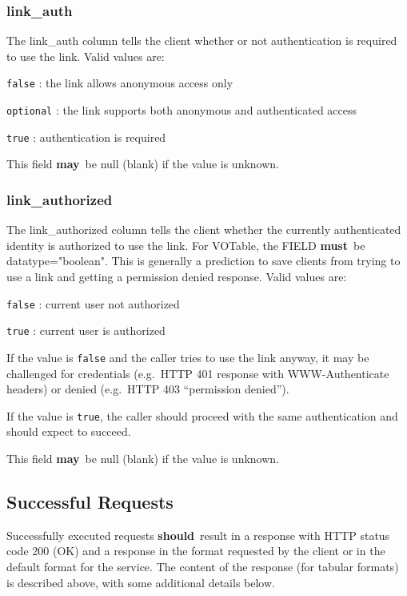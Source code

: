 \documentclass[11pt,a4paper]{ivoa}
\newcommand{\attval}[2]{#1={\allowbreak}{"}#2{"}}
\newcommand{\rfcmust}{\textbf{must}}
\newcommand{\rfcshould}{\textbf{should}}
\newcommand{\rfcmay}{\textbf{may}}
\begin{document}
\subsubsection{link\_auth}
\label{sec:linkAuth}

The link\_auth column tells the client whether or not authentication is required
to use the link. Valid values are:

\verb|false| : the link allows anonymous access only

\verb|optional| : the link supports both anonymous and authenticated access

\verb|true| : authentication is required

This field \rfcmay\ be null (blank) if the value is unknown.

\subsubsection{link\_authorized}
\label{sec:linkAuthorized}

The link\_authorized column tells the client whether the currently authenticated
identity is authorized to use the link. For VOTable, the FIELD \rfcmust\ be
\attval{datatype}{boolean}. This is generally a prediction to save
clients from trying to use a link and getting a permission denied response. Valid
values are:

\verb|false| : current user not authorized

\verb|true| : current user is authorized

If the value is \verb|false| and the caller tries to use the link anyway, it may be
challenged for credentials (e.g.\ HTTP 401 response with WWW-Authenticate headers) or
denied (e.g.\ HTTP 403 ``permission denied'').

If the value is \verb|true|, the caller should proceed with the same authentication
and should expect to succeed.

This field \rfcmay\ be null (blank) if the value is unknown.

\subsection{Successful Requests}
\label{sec:successfulRequests}

Successfully executed requests \rfcshould\ result in a response with HTTP
status code 200 (OK) and a response in the format requested by the client
or in the default format for the service. The content of the response
(for tabular formats) is described above,
with some additional details below.
\end{document}
